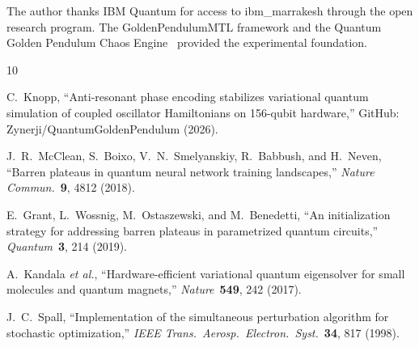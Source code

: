 \documentclass[twocolumn,showpacs,preprintnumbers,amsmath,amssymb,aps,prl]{revtex4-2}
\begin{document}
\begin{acknowledgments}
The author thanks IBM Quantum for access to ibm\_marrakesh through the open research program. The GoldenPendulumMTL framework and the Quantum Golden Pendulum Chaos Engine~\cite{knopp2026qgp} provided the experimental foundation.
\end{acknowledgments}

\begin{thebibliography}{10}

C.~Knopp,
``Anti-resonant phase encoding stabilizes variational quantum simulation of coupled oscillator Hamiltonians on 156-qubit hardware,''
GitHub: Zynerji/QuantumGoldenPendulum (2026).

J.~R.~McClean, S.~Boixo, V.~N.~Smelyanskiy, R.~Babbush, and H.~Neven,
``Barren plateaus in quantum neural network training landscapes,''
\textit{Nature Commun.}~\textbf{9}, 4812 (2018).

E.~Grant, L.~Wossnig, M.~Ostaszewski, and M.~Benedetti,
``An initialization strategy for addressing barren plateaus in parametrized quantum circuits,''
\textit{Quantum}~\textbf{3}, 214 (2019).

A.~Kandala \textit{et al.},
``Hardware-efficient variational quantum eigensolver for small molecules and quantum magnets,''
\textit{Nature}~\textbf{549}, 242 (2017).

J.~C.~Spall,
``Implementation of the simultaneous perturbation algorithm for stochastic optimization,''
\textit{IEEE Trans.\ Aerosp.\ Electron.\ Syst.}~\textbf{34}, 817 (1998).

\end{thebibliography}
\end{document}
